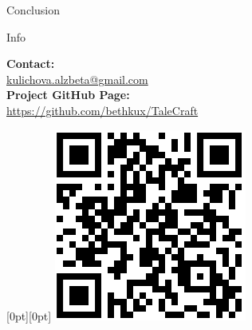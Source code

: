 \documentclass[portrait,a0paper,fontscale=0.35]{baposter}
\begin{document}
\begin{poster}
\begin{posterbox}[column=1, name=conclusion, below=result2, headerColorOne=yellow!80!orange!95!black, boxColorOne=yellow!33]{Conclusion}
\end{posterbox}


\begin{posterbox}[column=1, name=info, below=conclusion]{Info}

 


\vspace{5mm}
    \textbf{Contact:} \\
    \href{mailto:kulichova.alzbeta@gmail.com}{kulichova.alzbeta@gmail.com} \\[1ex]
    \textbf{Project GitHub Page:} \\
    \href{https://github.com/bethkux/TaleCraft}{https://github.com/bethkux/TaleCraft}
    



\begin{flushright}
\raisebox{10pt}[0pt][0pt]{%
\includegraphics[width=0.18\linewidth]{img/image_2025-08-06_200800481.png}%
}
\end{flushright}
\end{posterbox}




\end{poster}
\end{document}
